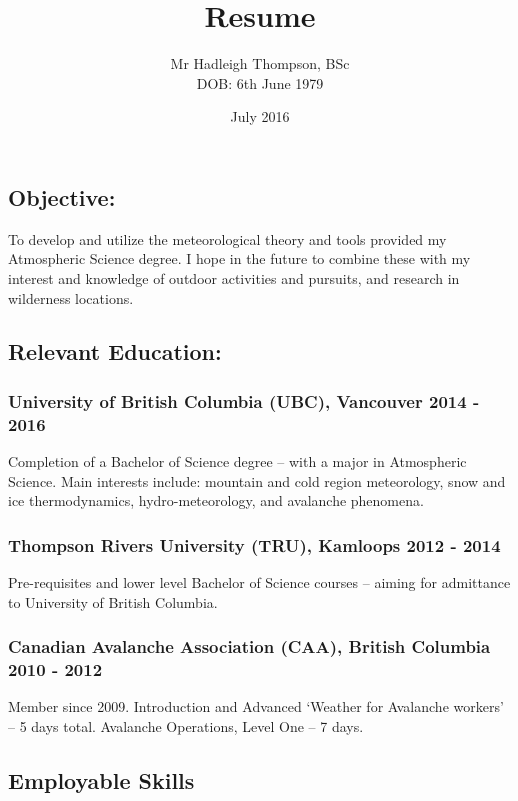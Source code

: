\documentclass[]{article}
\title{Resume}
\author{Mr Hadleigh Thompson, BSc \\ \scriptsize{DOB: 6th June 1979}}
\date{\scriptsize{July 2016}}
\begin{document}
\maketitle

\subsection*{Objective:}  
To develop and utilize the meteorological theory and tools provided my Atmospheric Science degree. I hope in the future to combine these with my interest and knowledge of outdoor activities and pursuits, and research in wilderness locations. 

\subsection*{Relevant Education:}
\subsubsection*{University of British Columbia (UBC), Vancouver 2014 - 2016}
Completion of a Bachelor of Science degree – with a major in Atmospheric Science. Main
interests include: mountain and cold region meteorology, snow and ice thermodynamics,
hydro-meteorology, and avalanche phenomena.
\subsubsection*{Thompson Rivers University (TRU), Kamloops 2012 - 2014}
Pre-requisites and lower level Bachelor of Science courses – aiming for admittance to University of British
Columbia.
\subsubsection*{Canadian Avalanche Association (CAA), British Columbia 2010 - 2012}
Member since 2009. Introduction and Advanced ‘Weather for Avalanche workers’ – 5 days total. Avalanche Operations, Level One – 7 days.

\subsection*{Employable Skills}
\end{document}
